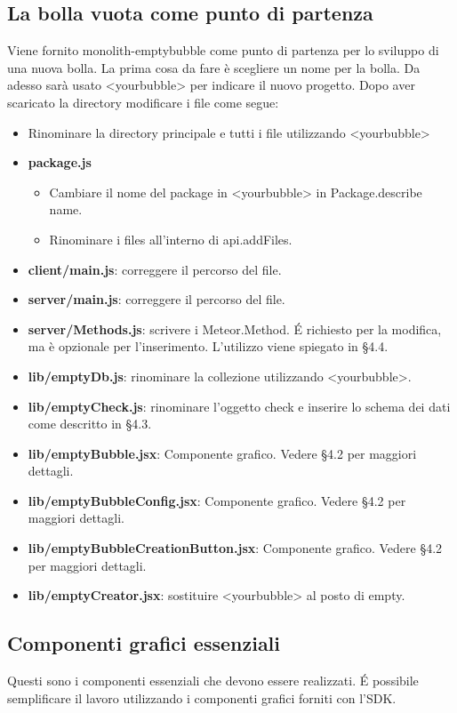 \subsection{La bolla vuota come punto di partenza}
Viene fornito monolith-emptybubble come punto di partenza per lo sviluppo di una nuova bolla. La prima cosa da fare è scegliere un nome per la bolla. Da adesso sarà usato <yourbubble> per indicare il nuovo progetto. Dopo aver scaricato la directory modificare i file come segue:
\begin{itemize}
	\item Rinominare la directory principale e tutti i file utilizzando <yourbubble>
	\item \textbf{package.js}
		\begin{itemize}
			\item Cambiare il nome del package  in <yourbubble> in Package.describe name.
			\item Rinominare i files all'interno di api.addFiles. 
		\end{itemize}
	\item \textbf{client/main.js}: correggere il percorso del file.
	\item \textbf{server/main.js}: correggere il percorso del file.
	\item \textbf{server/Methods.js}: scrivere i Meteor.Method. \'E richiesto per la modifica, ma è opzionale per l'inserimento. L'utilizzo viene spiegato in \S 4.4.
	\item \textbf{lib/emptyDb.js}: rinominare la collezione utilizzando <yourbubble>.
	\item \textbf{lib/emptyCheck.js}: rinominare l'oggetto check e inserire lo schema dei dati come descritto in \S 4.3.
	\item \textbf{lib/emptyBubble.jsx}: Componente grafico. Vedere \S 4.2 per maggiori dettagli.
	\item \textbf{lib/emptyBubbleConfig.jsx}: Componente grafico. Vedere \S 4.2 per maggiori dettagli.	
	\item \textbf{lib/emptyBubbleCreationButton.jsx}: Componente grafico. Vedere \S 4.2 per maggiori dettagli.
	\item \textbf{lib/emptyCreator.jsx}: sostituire <yourbubble> al posto di empty.
		
\end{itemize}

\subsection{Componenti grafici essenziali}
Questi sono i componenti essenziali che devono essere realizzati. \'E possibile semplificare il lavoro utilizzando i componenti grafici forniti con l'SDK.

